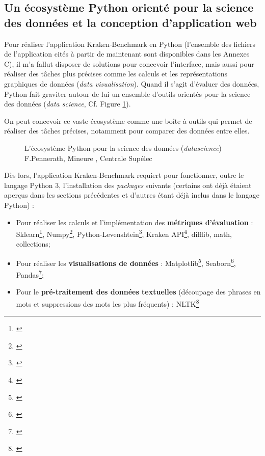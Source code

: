 \subsection{Un écosystème Python orienté pour la science des données et la conception d'application web}

Pour réaliser l'application Kraken-Benchmark en Python (l'ensemble des fichiers de l'application cités à partir de maintenant sont disponibles dans les Annexes C), il m'a fallut disposer de solutions pour concevoir l'interface, mais aussi pour réaliser des tâches plus précises comme les calculs et les représentations graphiques de données (\textit{data visualisation}). Quand il s'agit d'évaluer des données, Python fait graviter autour de lui un ensemble d'outils orientés pour la science des données (\textit{data science}, Cf. Figure \ref{fig:eco_datascience}).

On peut concevoir ce vaste écosystème comme une boîte à outils qui permet de réaliser des tâches précises, notamment pour comparer des données entre elles.  

\begin{figure}[h!]
    \centering
    \centerline{}
    \caption{L'écosystème Python pour la science des données (\textit{datascience})   \textcopyright F.Pennerath, Mineure , Centrale Supélec}
    \label{fig:eco_datascience}
\end{figure}

Dès lors, l'application Kraken-Benchmark requiert pour fonctionner, outre le langage Python 3, l'installation des \textit{packages} suivants (certains ont déjà étaient aperçus dans les sections précédentes et d'autres étant déjà inclus dans le langage Python) : 

\begin{itemize}
    \item Pour réaliser les calculs et l'implémentation des \textbf{métriques d'évaluation} : Sklearn\footnote{\cite{noauthor_scikit-learn_nodate}}, Numpy\footnote{\cite{noauthor_numpy_nodate}}, Python-Levenshtein\footnote{\cite{noauthor_python-levenshtein_nodate}}, Kraken API\footnote{\cite{noauthor_kraken_nodate}}, difflib, math, collections;
    \item Pour réaliser les \textbf{visualisations de données} : Matplotlib\footnote{\cite{noauthor_matplotlib_nodate}}, Seaborn\footnote{\cite{noauthor_seaborn_nodate}}, Pandas\footnote{\cite{noauthor_pandas_nodate}};
    \item Pour le \textbf{pré-traitement des données textuelles} (découpage des phrases en mots et suppressions des mots les plus fréquents) : NLTK\footnote{\cite{noauthor_nltk_nodate}}
\end{itemize}

